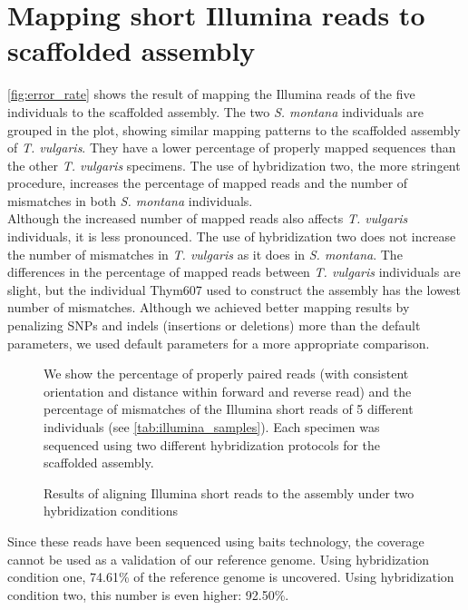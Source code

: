 \section*{Mapping short Illumina reads to scaffolded assembly}

\autoref{fig:error_rate} shows the result of mapping the Illumina reads of the five individuals to the scaffolded assembly. The two \textit{S. montana} individuals are grouped in the plot, showing similar mapping patterns to the scaffolded assembly of \textit{T. vulgaris}. They have a lower percentage of properly mapped sequences than the other \textit{T. vulgaris} specimens. The use of hybridization two, the more stringent procedure, increases the percentage of mapped reads and the number of mismatches in both \textit{S. montana} individuals.\\

Although the increased number of mapped reads also affects \textit{T. vulgaris} individuals, it is less pronounced. The use of hybridization two does not increase the number of mismatches in \textit{T. vulgaris} as it does in \textit{S. montana}. The differences in the percentage of mapped reads between \textit{T. vulgaris} individuals are slight, but the individual Thym607 used to construct the assembly has the lowest number of mismatches. Although we achieved better mapping results by penalizing \ac{SNP}s and indels (insertions or deletions) more than the default parameters, we used default parameters for a more appropriate comparison.\\



\begin{figure}
    \begin{center}
        \def\svgwidth{\textwidth}
        
        \caption{Results of aligning Illumina short reads to the assembly under two hybridization conditions}            
        \label{fig:error_rate}
    \end{center}
    \footnotesize
    We show the percentage of properly paired reads (with consistent orientation and distance within forward and reverse read) and the percentage of mismatches of the Illumina short reads of 5 different individuals (see \autoref{tab:illumina_samples}). Each specimen was sequenced using two different hybridization protocols for the scaffolded assembly.     
\end{figure}   

Since these reads have been sequenced using baits technology, the coverage cannot be used as a validation of our reference genome. Using hybridization condition one, 74.61\% of the reference genome is uncovered. Using hybridization condition two, this number is even higher: 92.50\%. 